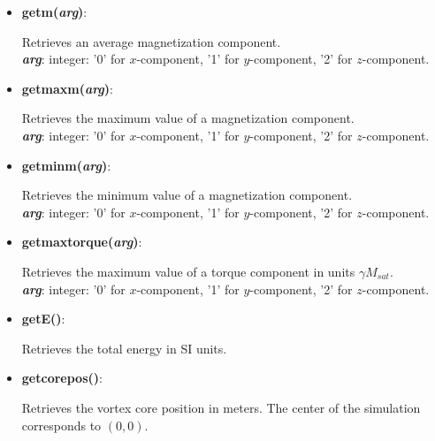 \begin{itemize}

 \item {\textbf{getm(\textit{arg})}:
				\flushright\parbox{0.9 \textwidth}{\vspace{-0.25cm} 
				Retrieves an average magnetization component.\\
				\textbf{\textit{arg}}: integer: '0' for $x$-component, '1' for $y$-component, '2' for $z$-component.
				}\flushleft}

 \item {\vspace{-0.4cm}\textbf{getmaxm(\textit{arg})}:
				\flushright\parbox{0.9 \textwidth}{\vspace{-0.25cm} 
				Retrieves the maximum value of a magnetization component.\\
				\textbf{\textit{arg}}: integer: '0' for $x$-component, '1' for $y$-component, '2' for $z$-component.
				}\flushleft}

 \item {\vspace{-0.4cm}\textbf{getminm(\textit{arg})}:
				\flushright\parbox{0.9 \textwidth}{\vspace{-0.25cm} 
				Retrieves the minimum value of a magnetization component.\\
				\textbf{\textit{arg}}: integer: '0' for $x$-component, '1' for $y$-component, '2' for $z$-component.
				}\flushleft}

 \item {\vspace{-0.4cm}\textbf{getmaxtorque(\textit{arg})}:
				\flushright\parbox{0.9 \textwidth}{\vspace{-0.25cm} 
				Retrieves the maximum value of a torque component in units $\gamma M_{sat}$.\\
				\textbf{\textit{arg}}: integer: '0' for $x$-component, '1' for $y$-component, '2' for $z$-component.
				}\flushleft}

 \item {\vspace{-0.4cm}\textbf{getE()}:
				\flushright\parbox{0.9 \textwidth}{\vspace{-0.25cm} 
				Retrieves the total energy in SI units.
				}\flushleft}

 \item {\vspace{-0.4cm}\textbf{getcorepos(\textit{})}:
				\flushright\parbox{0.9 \textwidth}{\vspace{-0.25cm} 
				Retrieves the vortex core position in meters.  The center of the simulation corresponds to $(0,0)$.
				}\flushleft}

\end{itemize}

